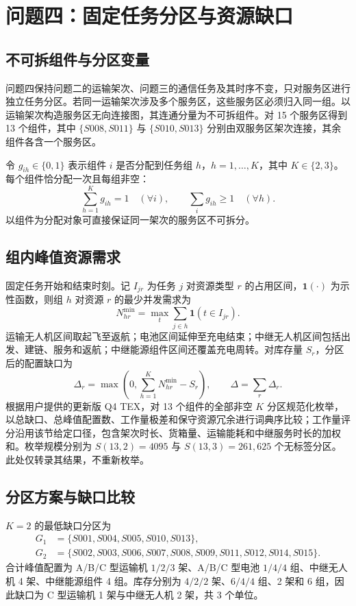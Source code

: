 \section{问题四：固定任务分区与资源缺口}
\subsection{不可拆组件与分区变量}
问题四保持问题二的运输架次、问题三的通信任务及其时序不变，只对服务区进行独立任务分区。若同一运输架次涉及多个服务区，这些服务区必须归入同一组。以运输架次构造服务区无向连接图，其连通分量为不可拆组件。对 15 个服务区得到 13 个组件，其中 $\{S008,S011\}$ 与 $\{S010,S013\}$ 分别由双服务区架次连接，其余组件各含一个服务区。

令 $g_{ih}\in\{0,1\}$ 表示组件 $i$ 是否分配到任务组 $h$，$h=1,\ldots,K$，其中 $K\in\{2,3\}$。每个组件恰分配一次且每组非空：
\begin{equation}
  \sum_{h=1}^{K}g_{ih}=1\quad(\forall i),\qquad
  \sum_i g_{ih}\geq 1\quad(\forall h).
  \label{eq:q4assign}
\end{equation}
以组件为分配对象可直接保证同一架次的服务区不可拆分。

\subsection{组内峰值资源需求}
固定任务开始和结束时刻。记 $I_{jr}$ 为任务 $j$ 对资源类型 $r$ 的占用区间，$\mathbf{1}(\cdot)$ 为示性函数，则组 $h$ 对资源 $r$ 的最少并发需求为
\begin{equation}
  N_{hr}^{\min}=\max_t\sum_{j\in h}\mathbf{1}(t\in I_{jr}).
  \label{eq:q4peak}
\end{equation}
运输无人机区间取起飞至返航；电池区间延伸至充电结束；中继无人机区间包括出发、建链、服务和返航；中继能源组件区间还覆盖充电周转。对库存量 $S_r$，分区后的配置缺口为
\begin{equation}
  \Delta_r=\max\left(0,\sum_{h=1}^{K}N_{hr}^{\min}-S_r\right),\qquad
  \Delta=\sum_r\Delta_r.
  \label{eq:q4gap}
\end{equation}
根据用户提供的更新版 Q4 TEX，对 13 个组件的全部非空 $K$ 分区规范化枚举，以总缺口、总峰值配置数、工作量极差和保守资源冗余进行词典序比较；工作量评分沿用该节给定口径，包含架次时长、货箱量、运输能耗和中继服务时长的加权和。枚举规模分别为 $S(13,2)=4095$ 与 $S(13,3)=261{,}625$ 个无标签分区。此处仅转录其结果，不重新枚举。

\subsection{分区方案与缺口比较}
$K=2$ 的最低缺口分区为
\begin{align*}
G_1&=\{S001,S004,S005,S010,S013\},\\
G_2&=\{S002,S003,S006,S007,S008,S009,S011,S012,S014,S015\}.
\end{align*}
合计峰值配置为 A/B/C 型运输机 $1/2/3$ 架、A/B/C 型电池 $1/4/4$ 组、中继无人机 4 架、中继能源组件 4 组。库存分别为 $4/2/2$ 架、$6/4/4$ 组、2 架和 6 组，因此缺口为 C 型运输机 1 架与中继无人机 2 架，共 3 个单位。

